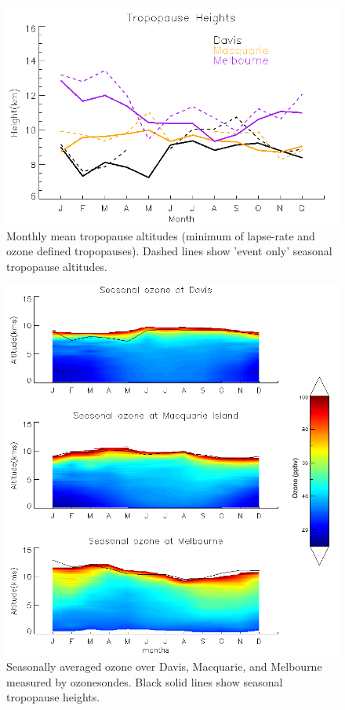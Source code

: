    \begin{figure}\begin{center}
      \includegraphics[width=0.8\columnwidth]{Figures/Ozone/tpheights.png}
      \caption{
	Monthly mean tropopause altitudes (minimum of lapse-rate and ozone defined tropopauses). Dashed lines show 'event only' seasonal tropopause altitudes.%
      }
      \label{ch_o3:fig:seasonaltpheights}
    \end{center}\end{figure}

    \begin{figure}\begin{center}
      \includegraphics[width=0.8\columnwidth]{Figures/Ozone/seasonaltropozone.png}
      \caption{
	Seasonally averaged ozone over Davis, Macquarie, and Melbourne measured by ozonesondes.
	Black solid lines show seasonal tropopause heights.%
      }
      \label{ch_o3:fig:seasonaltropozone}
    \end{center}\end{figure}
    
